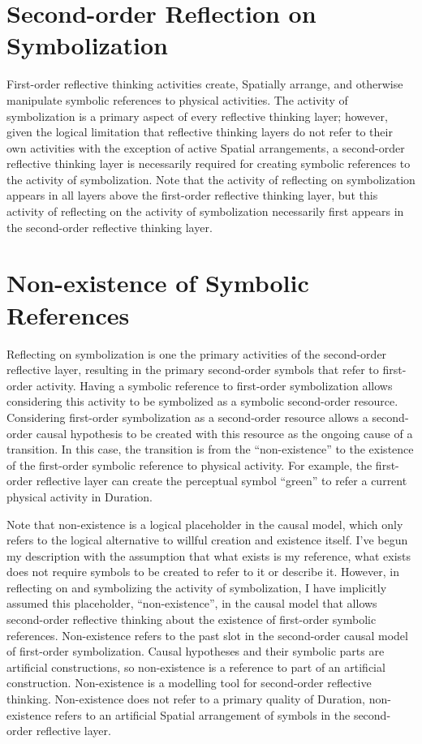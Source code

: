 \section{Second-order Reflection on Symbolization}

First-order reflective thinking activities create, Spatially arrange,
and otherwise manipulate symbolic references to physical activities.
The activity of symbolization is a primary aspect of every reflective
thinking layer; however, given the logical limitation that reflective
thinking layers do not refer to their own activities with the
exception of active Spatial arrangements, a second-order reflective
thinking layer is necessarily required for creating symbolic
references to the activity of symbolization.  Note that the activity
of reflecting on symbolization appears in all layers above the
first-order reflective thinking layer, but this activity of reflecting
on the activity of symbolization necessarily first appears in the
second-order reflective thinking layer.

\section{Non-existence of Symbolic References}

Reflecting on symbolization is one the primary activities of the
second-order reflective layer, resulting in the primary second-order
symbols that refer to first-order activity.  Having a symbolic
reference to first-order symbolization allows considering this
activity to be symbolized as a symbolic second-order resource.
Considering first-order symbolization as a second-order resource
allows a second-order causal hypothesis to be created with this
resource as the ongoing cause of a transition.  In this case, the
transition is from the ``non-existence'' to the existence of the
first-order symbolic reference to physical activity.  For example, the
first-order reflective layer can create the perceptual symbol
``green'' to refer a current physical activity in Duration.

Note that non-existence is a logical placeholder in the causal model,
which only refers to the logical alternative to willful creation and
existence itself.  I've begun my description with the assumption that
what exists is my reference, what exists does not require symbols to
be created to refer to it or describe it.  However, in reflecting on
and symbolizing the activity of symbolization, I have implicitly
assumed this placeholder, ``non-existence'', in the causal model that
allows second-order reflective thinking about the existence of
first-order symbolic references.  Non-existence refers to the past
slot in the second-order causal model of first-order symbolization.
Causal hypotheses and their symbolic parts are artificial
constructions, so non-existence is a reference to part of an
artificial construction.  Non-existence is a modelling tool for
second-order reflective thinking.  Non-existence does not refer to a
primary quality of Duration, non-existence refers to an artificial
Spatial arrangement of symbols in the second-order reflective layer.

